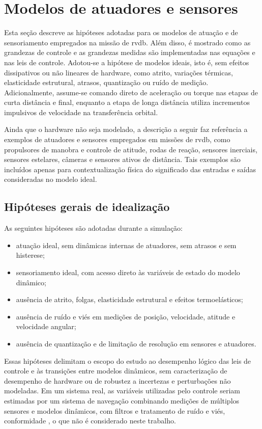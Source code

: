 \section{Modelos de atuadores e sensores}
\label{sec:modelos_atuadores_sensores}

Esta seção descreve as hipóteses adotadas para os modelos de atuação e de sensoriamento empregados na missão de \gls{rvdb}. 
Além disso, é mostrado como as grandezas de controle e as grandezas medidas são implementadas nas equações e nas leis de controle. 
Adotou-se a hipótese de modelos ideais, isto é, sem efeitos dissipativos ou não lineares de hardware, como atrito, variações térmicas, elasticidade estrutural, atrasos, quantização ou ruído de medição.
Adicionalmente, assume-se comando direto de aceleração ou torque nas etapas de curta distância e final, enquanto a etapa de longa distância utiliza incrementos impulsivos de velocidade na transferência orbital.

Ainda que o hardware não seja modelado, a descrição a seguir faz referência a exemplos de atuadores e sensores empregados em missões de \gls{rvdb}, como propulsores de manobra e controle de atitude, rodas de reação, sensores inerciais, sensores estelares, câmeras e sensores ativos de distância.
Tais exemplos são incluídos apenas para contextualização física do significado das entradas e saídas consideradas no modelo ideal.

\subsection{Hipóteses gerais de idealização}
\label{subsec:hipoteses_idealizacao}

As seguintes hipóteses são adotadas durante a simulação:
\begin{itemize}
\item atuação ideal, sem dinâmicas internas de atuadores, sem atrasos e sem histerese;
\item sensoriamento ideal, com acesso direto às variáveis de estado do modelo dinâmico;
\item ausência de atrito, folgas, elasticidade estrutural e efeitos termoelásticos;
\item ausência de ruído e viés em medições de posição, velocidade, atitude e velocidade angular;
\item ausência de quantização e de limitação de resolução em sensores e atuadores.
\end{itemize}

Essas hipóteses delimitam o escopo do estudo ao desempenho lógico das leis de controle e às transições entre modelos dinâmicos, sem caracterização de desempenho de hardware ou de robustez a incertezas e perturbações não modeladas.
Em um sistema real, as variáveis utilizadas pelo controle seriam estimadas por um sistema de navegação combinando medições de múltiplos sensores e modelos dinâmicos, com filtros e tratamento de ruído e viés, conformidade \cite{wertz2011sme_smad}, o que não é considerado neste trabalho.

